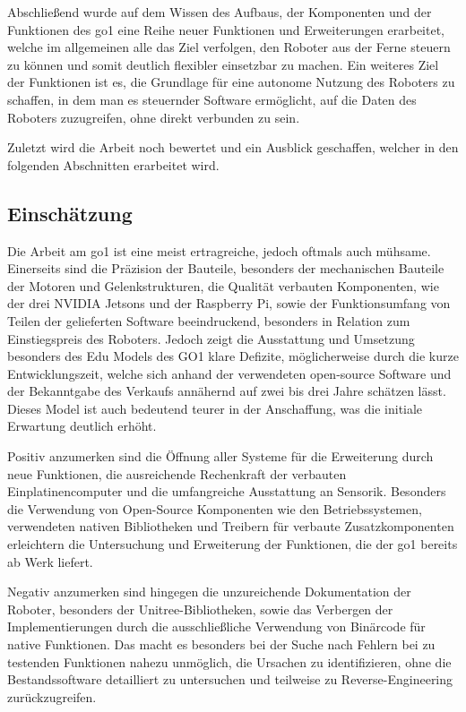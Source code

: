 Abschließend wurde auf dem Wissen des Aufbaus, der Komponenten und der Funktionen des \gls{go1} eine Reihe neuer Funktionen
und Erweiterungen erarbeitet, welche im allgemeinen alle das Ziel verfolgen, den Roboter aus der Ferne steuern zu können
und somit deutlich flexibler einsetzbar zu machen.
Ein weiteres Ziel der Funktionen ist es, die Grundlage für eine autonome Nutzung des Roboters zu schaffen, in dem man es
steuernder Software ermöglicht, auf die Daten des Roboters zuzugreifen, ohne direkt verbunden zu sein.

Zuletzt wird die Arbeit noch bewertet und ein Ausblick geschaffen, welcher in den folgenden Abschnitten erarbeitet wird.

\subsection{Einschätzung}
\label{subsec:einschatzung}

Die Arbeit am \gls{go1} ist eine meist ertragreiche, jedoch oftmals auch mühsame.
Einerseits sind die Präzision der Bauteile, besonders der mechanischen Bauteile der Motoren und Gelenkstrukturen, die Qualität
verbauten Komponenten, wie der drei NVIDIA Jetsons und der Raspberry Pi, sowie der Funktionsumfang von Teilen der
gelieferten Software beeindruckend, besonders in Relation zum Einstiegspreis des Roboters.
Jedoch zeigt die Ausstattung und Umsetzung besonders des Edu Models des GO1 klare Defizite, möglicherweise durch die kurze
Entwicklungszeit, welche sich anhand der verwendeten open-source Software und der Bekanntgabe des Verkaufs annähernd auf
zwei bis drei Jahre schätzen lässt.
Dieses Model ist auch bedeutend teurer in der Anschaffung, was die initiale Erwartung deutlich erhöht.

Positiv anzumerken sind die Öffnung aller Systeme für die Erweiterung durch neue Funktionen, die ausreichende Rechenkraft
der verbauten Einplatinencomputer und die umfangreiche Ausstattung an Sensorik.
Besonders die Verwendung von Open-Source Komponenten wie den Betriebssystemen, verwendeten nativen Bibliotheken und
Treibern für verbaute Zusatzkomponenten erleichtern die Untersuchung und Erweiterung der Funktionen, die der \gls{go1}
bereits ab Werk liefert.

Negativ anzumerken sind hingegen die unzureichende Dokumentation der Roboter, besonders der Unitree-Bibliotheken, sowie
das Verbergen der Implementierungen durch die ausschließliche Verwendung von Binärcode für native Funktionen.
Das macht es besonders bei der Suche nach Fehlern bei zu testenden Funktionen nahezu unmöglich, die Ursachen zu identifizieren,
ohne die Bestandssoftware detailliert zu untersuchen und teilweise zu Reverse-Engineering zurückzugreifen.

